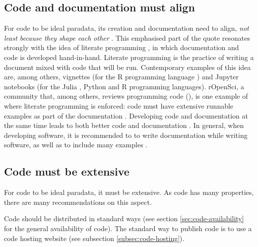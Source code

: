 \subsection{Code and documentation must align}

For code to be ideal paradata, 
its creation and documentation need to align, 
\emph{not least because they shape each other} \cite{huvila2022improving}.
This emphasised part of the quote resonates strongly with the idea of 
literate programming \cite{knuth1984literate},
in which documentation and code is developed hand-in-hand.
Literate programming is the practice of writing a document mixed with code that 
will be run.
Contemporary examples of this idea are, among others, 
vignettes \cite{wickham2015r} (for the R programming language \cite{r}) 
and Jupyter notebooks \cite{wang2020assessing} 
(for the Julia \cite{Julia-2017}, Python \cite{van1995python} and R \cite{r}
programming languages).
rOpenSci, a community that, among others, reviews programming
code (\cite{ram2013ropensci,ram2018community}), is 
one example of where literate programming is enforced:
code must have extensive runnable examples
as part of the documentation \cite{ropensci_2021_6619350}.
Developing code and documentation at the same time 
leads to both better code and documentation \cite{reenskaug1989environment}.
In general, when developing software, 
it is recommended to 
to write documentation while writing software,
as well as to include many examples \cite{lee2018ten}.

\subsection{Code must be extensive}

For code to be ideal paradata, it must be extensive.
As code has many properties, there are many recommendations on this aspect.

Code should be distributed in standard ways \cite{peng2006reproducible}
(see section \ref{sec:code-availability}
for the general availability of code).
The standard way to publish code is to use a code hosting website
(see subsection \ref{subsec:code-hosting}).


